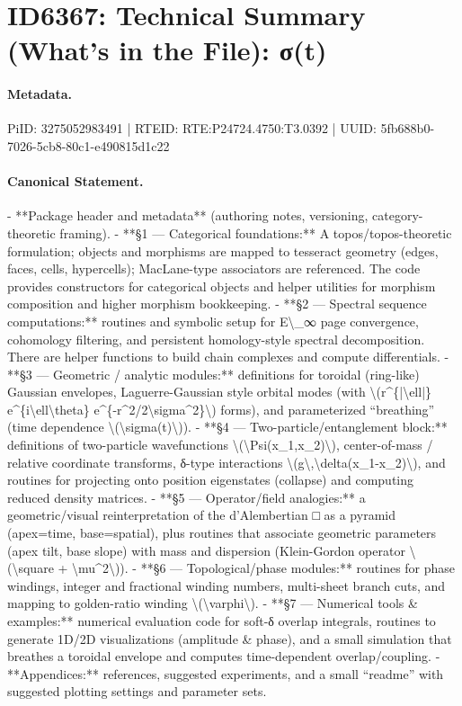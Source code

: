 \section*{ID6367: Technical Summary (What’s in the File): σ(t)}
\paragraph{Metadata.}
PiID: 3275052983491 | RTEID: RTE:P24724.4750:T3.0392 | UUID: 5fb688b0-7026-5cb8-80c1-e490815d1c22

\paragraph{Canonical Statement.}
- **Package header and metadata** (authoring notes, versioning, category-theoretic framing). - **§1 — Categorical foundations:** A topos/topos-theoretic formulation; objects and morphisms are mapped to tesseract geometry (edges, faces, cells, hypercells); MacLane-type associators are referenced. The code provides constructors for categorical objects and helper utilities for morphism composition and higher morphism bookkeeping. - **§2 — Spectral sequence computations:** routines and symbolic setup for E\textbackslash{}\_∞ page convergence, cohomology filtering, and persistent homology-style spectral decomposition. There are helper functions to build chain complexes and compute differentials. - **§3 — Geometric / analytic modules:** definitions for toroidal (ring-like) Gaussian envelopes, Laguerre-Gaussian style orbital modes (with \textbackslash{}(r\textasciicircum{}\{|\textbackslash{}ell|\} e\textasciicircum{}\{i\textbackslash{}ell\textbackslash{}theta\} e\textasciicircum{}\{-r\textasciicircum{}2/2\textbackslash{}sigma\textasciicircum{}2\}\textbackslash{}) forms), and parameterized “breathing” (time dependence \textbackslash{}(\textbackslash{}sigma(t)\textbackslash{})). - **§4 — Two-particle/entanglement block:** definitions of two-particle wavefunctions \textbackslash{}(\textbackslash{}Psi(x\_1,x\_2)\textbackslash{}), center-of-mass / relative coordinate transforms, δ-type interactions \textbackslash{}(g\textbackslash{},\textbackslash{}delta(x\_1-x\_2)\textbackslash{}), and routines for projecting onto position eigenstates (collapse) and computing reduced density matrices. - **§5 — Operator/field analogies:** a geometric/visual reinterpretation of the d’Alembertian □ as a pyramid (apex=time, base=spatial), plus routines that associate geometric parameters (apex tilt, base slope) with mass and dispersion (Klein-Gordon operator \textbackslash{}(\textbackslash{}square + \textbackslash{}mu\textasciicircum{}2\textbackslash{})). - **§6 — Topological/phase modules:** routines for phase windings, integer and fractional winding numbers, multi-sheet branch cuts, and mapping to golden-ratio winding \textbackslash{}(\textbackslash{}varphi\textbackslash{}). - **§7 — Numerical tools \& examples:** numerical evaluation code for soft-δ overlap integrals, routines to generate 1D/2D visualizations (amplitude \& phase), and a small simulation that breathes a toroidal envelope and computes time-dependent overlap/coupling. - **Appendices:** references, suggested experiments, and a small “readme” with suggested plotting settings and parameter sets.

